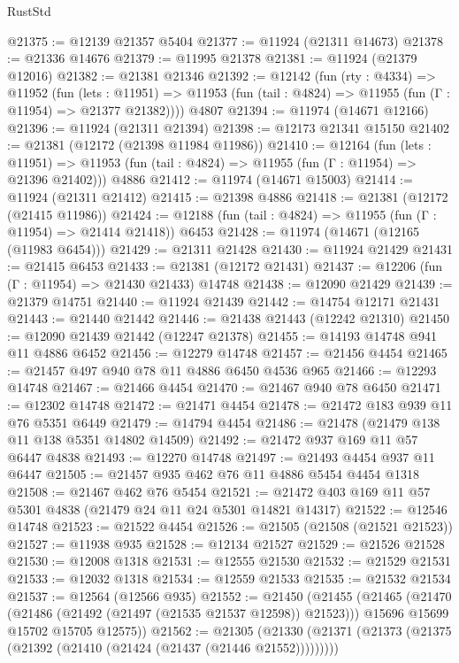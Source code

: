 \begin{lexlean}{RustStd}
\begin{coremodule}
{\begin{coremodule}
{{{{{{{{{{{{{{{{{{{{{{{{{{{{{{{{{{{{{{{{{{{{{{{{{{{{{{{{{{{{{{{{{{{{{{{{{{{{{{{{@21375 := @12139 @21357 @5404
@21377 := @11924 (@21311 @14673)
@21378 := @21336 @14676
@21379 := @11995 @21378
@21381 := @11924 (@21379 @12016)
@21382 := @21381 @21346
@21392 := @12142
    (fun (rty : @4334) =>
    @11952
      (fun (lets : @11951) =>
      @11953 (fun (tail : @4824) => @11955 (fun (Γ : @11954) => @21377 @21382))))
    @4807
@21394 := @11974 (@14671 @12166)
@21396 := @11924 (@21311 @21394)
@21398 := @12173 @21341 @15150
@21402 := @21381 (@12172 (@21398 @11984 @11986))
@21410 := @12164
    (fun (lets : @11951) =>
    @11953 (fun (tail : @4824) => @11955 (fun (Γ : @11954) => @21396 @21402)))
    @4886
@21412 := @11974 (@14671 @15003)
@21414 := @11924 (@21311 @21412)
@21415 := @21398 @4886
@21418 := @21381 (@12172 (@21415 @11986))
@21424 := @12188 (fun (tail : @4824) => @11955 (fun (Γ : @11954) => @21414 @21418)) @6453
@21428 := @11974 (@14671 (@12165 (@11983 @6454)))
@21429 := @21311 @21428
@21430 := @11924 @21429
@21431 := @21415 @6453
@21433 := @21381 (@12172 @21431)
@21437 := @12206 (fun (Γ : @11954) => @21430 @21433) @14748
@21438 := @12090 @21429
@21439 := @21379 @14751
@21440 := @11924 @21439
@21442 := @14754 @12171 @21431
@21443 := @21440 @21442
@21446 := @21438 @21443 (@12242 @21310)
@21450 := @12090 @21439 @21442 (@12247 @21378)
@21455 := @14193 @14748 @941 @11 @4886 @6452
@21456 := @12279 @14748
@21457 := @21456 @4454
@21465 := @21457 @497 @940 @78 @11 @4886 @6450 @4536 @965
@21466 := @12293 @14748
@21467 := @21466 @4454
@21470 := @21467 @940 @78 @6450
@21471 := @12302 @14748
@21472 := @21471 @4454
@21478 := @21472 @183 @939 @11 @76 @5351 @6449
@21479 := @14794 @4454
@21486 := @21478 (@21479 @138 @11 @138 @5351 @14802 @14509)
@21492 := @21472 @937 @169 @11 @57 @6447 @4838
@21493 := @12270 @14748
@21497 := @21493 @4454 @937 @11 @6447
@21505 := @21457 @935 @462 @76 @11 @4886 @5454 @4454 @1318
@21508 := @21467 @462 @76 @5454
@21521 := @21472 @403 @169 @11 @57 @5301 @4838 (@21479 @24 @11 @24 @5301 @14821 @14317)
@21522 := @12546 @14748
@21523 := @21522 @4454
@21526 := @21505 (@21508 (@21521 @21523))
@21527 := @11938 @935
@21528 := @12134 @21527
@21529 := @21526 @21528
@21530 := @12008 @1318
@21531 := @12555 @21530
@21532 := @21529 @21531
@21533 := @12032 @1318
@21534 := @12559 @21533
@21535 := @21532 @21534
@21537 := @12564 (@12566 @935)
@21552 := @21450
    (@21455
      (@21465
        (@21470 (@21486 (@21492 (@21497 (@21535 @21537 @12598)) @21523)))
        @15696
        @15699
        @15702
        @15705
        @12575))
@21562 := @21305
    (@21330 (@21371 (@21373 (@21375 (@21392 (@21410 (@21424 (@21437 (@21446 @21552)))))))))
}}}}}}}}}}}}}}}}}}}}}}}}}}}}}}}}}}}}}}}}}}}}}}}}}}}}}}}}}}}}}}}}}}}}}}}}}}}}}}}}
\end{coremodule}}
\end{coremodule}
\end{lexlean}
